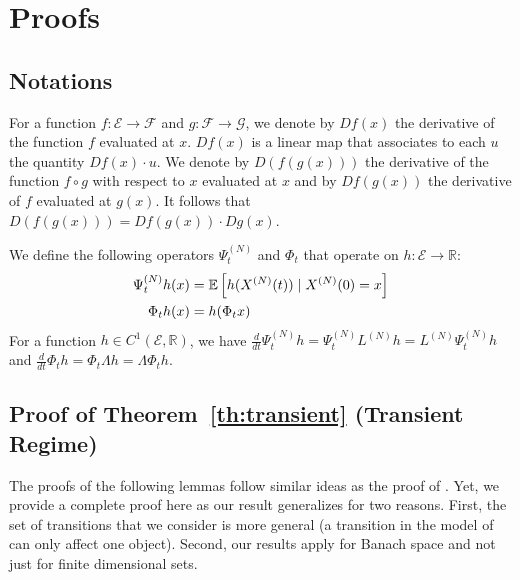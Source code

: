 \documentclass[sigconf]{acmart}
\newcommand\XN{X^{(N)}}
\newcommand\LN{L^{(N)}}
\newcommand\PsiN{\Psi^{(N)}}
\newcommand\E{\mathcal{E}}
\newcommand\R{\mathbb{R}}
\newcommand\esp[1]{{\mathchoice{\besp{#1}}{\sesp{#1}}{\sesp{#1}}{\sesp{#1}}}}
\newcommand\besp[1]{\mathbb{E}\left[#1\right]}
\newcommand\sesp[1]{\mathbb{E}[#1]}
\newcommand\F{\mathcal{F}}
\newcommand\dt{\frac{d}{dt}}
\begin{document}
\section{Proofs}
\label{sec:proofs}

\subsection*{Notations} 
For a function $f:\E\to\F$ and $g:\F\to\mathcal{G}$, we denote by
$Df(x)$ the derivative of the function $f$ evaluated at $x$. $Df(x)$
is a linear map that associates to each $u$ the quantity
$Df(x)\cdot u$.  We denote by $D(f(g(x)))$ the derivative of the
function $f\circ g$ with respect to $x$ evaluated at $x$ and by
$Df(g(x))$ the derivative of $f$ evaluated at $g(x)$. It follows
that $D(f(g(x)))=Df(g(x))\cdot
Dg(x)$.  

We define the following operators $\PsiN_t$ and $\Phi_t$ that operate
on $h:\E\to\R$:
\begin{align}
  \PsiN_t h (x) &= \esp{ h(\XN(t)) \mid \XN(0) = x} \label{eq:operatorN}\\
  \Phi_t h (x) &= h( \Phi_tx ) \label{eq:operatorInf}
\end{align}
For a function $h\in C^1(\E,\R)$, we have
$\dt \PsiN_th = \PsiN_t\LN h= \LN\PsiN_t h$ and
$\dt \Phi_th = \Phi_t\Lambda h= \Lambda\Phi_t h$.




\subsection{Proof of Theorem~\ref{th:transient} (Transient Regime)}
\label{sec:proof_t}

The proofs of the following lemmas follow similar ideas as the proof
of \cite[Theorem~1]{kolokoltsov2011mean}. Yet, we provide a complete
proof here as our result generalizes
\cite[Theorem~1]{kolokoltsov2011mean} for two reasons.  First, the set
of transitions that we consider is more general (a transition in the
model of \cite{kolokoltsov2011mean} can only affect one
object). Second, our results apply for Banach space and not just for
finite dimensional sets.
\end{document}
